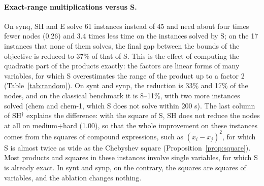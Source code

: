 \documentclass[10pt]{article}
\theoremstyle{definition}
\begin{document}
\begin{table}[H]
\centering
\caption{IbexOpt with the multiplications S (standard, the one of fAF2), SH and E: instances solved within the time limit $t_{\max}$ (s), geometric means of nodes and CPU time relative to S over the instances solved by all three, geometric mean of the nodes of E relative to SH, and numbers of instances where E needs at least 1\% fewer / more nodes than SH. SH$^\dagger$: SH for products, with the square of S (ablation; synq has no squares).}
\label{tab:solver}
\small
\setlength{\tabcolsep}{3.5pt}

\end{table}

\paragraph{Exact-range multiplications versus S.} On synq, SH and E solve 61 instances instead of 45 and need about four times fewer nodes (0.26) and 3.4 times less time on the instances solved by S; on the 17 instances that none of them solves, the final gap between the bounds of the objective is reduced to 37\% of that of S. This is the effect of computing the quadratic part of the products exactly: the factors are linear forms of many variables, for which S overestimates the range of the product up to a factor 2 (Table~\ref{tab:random}). On synt and synp, the reduction is 33\% and 17\% of the nodes, and on the classical benchmark it is 8--11\%, with two more instances solved (chem and chem-1, which S does not solve within 200 s). The last column of SH$^\dagger$ explains the difference: with the square of S, SH does not reduce the nodes at all on medium+hard (1.00), so that the whole improvement on these instances comes from the squares of compound expressions, such as $(x_i-x_j)^2$, for which S is almost twice as wide as the Chebyshev square (Proposition~\ref{prop:square}). Most products and squares in these instances involve single variables, for which S is already exact. In synt and synp, on the contrary, the squares are squares of variables, and the ablation changes nothing.
\end{document}
